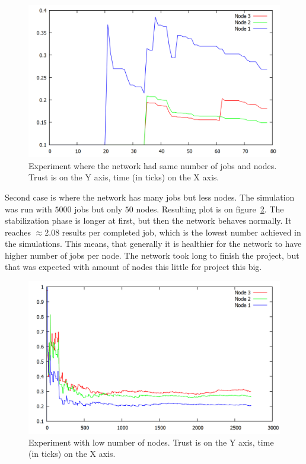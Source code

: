 \begin{figure}
\centering
\includegraphics[width=\textwidth]{diagrams/trust_less_jobs.png}
\caption{Experiment where the network had same number of jobs and nodes. Trust is on the Y axis, time (in ticks) on the X axis.}
\label{f:less_jobs}
\end{figure}

Second case is where the network has many jobs but less nodes. The simulation was run with $5000$ jobs but only $50$ nodes. Resulting plot is on figure~\ref{f:more_jobs}. The stabilization phase is longer at first, but then the network behaves normally. It reaches $\approx 2.08$ results per completed job, which is the lowest number achieved in the simulations. This means, that generally it is healthier for the network to have higher number of jobs per node. The network took long to finish the project, but that was expected with amount of nodes this little for project this big.

\begin{figure}
\centering
\includegraphics[width=\textwidth]{diagrams/trust_less_nodes.png}
\caption{Experiment with low number of nodes. Trust is on the Y axis, time (in ticks) on the X axis.}
\label{f:more_jobs}
\end{figure}

